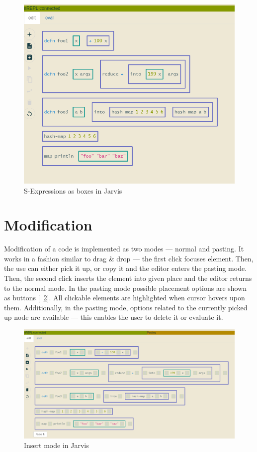 \documentclass[english,mgr,shortabstract]{iithesis}
\newcommand*{\figref}[1]{[\textbf{\figurename}~\ref{#1}]}
\begin{document}
\begin{figure}[hbt]
  \centering
  \includegraphics[scale=0.3]{img/j-boxes_f}
  \caption{S-Expressions as boxes in Jarvis}
\label{fig:j-box}
\end{figure}

\section{Modification}
Modification of a code is implemented as two modes --- normal and pasting.
It works in a fashion similar to drag \& drop --- the first click focuses element.
Then, the use can either pick it up, or copy it and the editor enters the
pasting mode.
Then, the second click inserts the element into given place and the editor
returns to the normal mode.
In the pasting mode possible placement options are shown as buttons
\figref{fig:j-insert}.
All clickable elements are highlighted when cursor hovers upon them.
Additionally, in the pasting mode, options related to the currently picked up
node are available --- this enables the user to delete it or evaluate it.


\begin{figure}[hbt]
  \centering
  \includegraphics[scale=0.3]{img/j-insert_f}
  \caption{Insert mode in Jarvis}
\label{fig:j-insert}
\end{figure}
\end{document}
